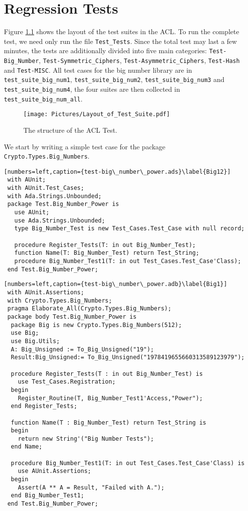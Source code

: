 \chapter{Regression Tests}
Figure \ref{ACLTEST} shows the layout of the test suites in the ACL. To run the complete test, we need only run the file \texttt{Test\_Tests}. Since the total test may last a few minutes, the tests are additionally divided into five main categories: \texttt{Test-Big\_Number}, \texttt{Test-Symmetric\_Ciphers}, \texttt{Test-Asymmetric\_Ciphers}, \texttt{Test-Hash} and \texttt{Test-MISC}. All test cases for the big number library are in \texttt{test\_suite\_big\_num1}, \texttt{test\_suite\_\-big\_num2}, \texttt{test\_suite\_big\_num3} and \texttt{test\_suite\_big\_num4}, the four suites are then collected in \texttt{test\_suite\_big\_num\_all}.
\begin{figure}[h]
  \texttt{[image: Pictures/Layout\_of\_Test\_Suite.pdf]} 
  \caption{The structure of the ACL Test.}\label{ACLTEST}
\end{figure}

We start by writing a simple test case for the package \texttt{Crypto.Types.Big\_Numbers}.
\begin{lstlisting}[numbers=left,caption={test-big\_number\_power.ads}\label{Big12}]
 with AUnit;
 with AUnit.Test_Cases;
 with Ada.Strings.Unbounded;  
 package Test.Big_Number_Power is
   use AUnit;
   use Ada.Strings.Unbounded;
   type Big_Number_Test is new Test_Cases.Test_Case with null record;
 
   procedure Register_Tests(T: in out Big_Number_Test);
   function Name(T: Big_Number_Test) return Test_String;
   procedure Big_Number_Test1(T: in out Test_Cases.Test_Case'Class);
 end Test.Big_Number_Power;
\end{lstlisting}

\begin{lstlisting}[numbers=left,caption={test-big\_number\_power.adb}\label{Big1}]
 with AUnit.Assertions; 
 with Crypto.Types.Big_Numbers;
 pragma Elaborate_All(Crypto.Types.Big_Numbers);
 package body Test.Big_Number_Power is
  package Big is new Crypto.Types.Big_Numbers(512);
  use Big;
  use Big.Utils;
  A: Big_Unsigned := To_Big_Unsigned("19");
  Result:Big_Unsigned:= To_Big_Unsigned("1978419655660313589123979");
	
  procedure Register_Tests(T : in out Big_Number_Test) is
	use Test_Cases.Registration;
  begin
	Register_Routine(T, Big_Number_Test1'Access,"Power");
  end Register_Tests;

  function Name(T : Big_Number_Test) return Test_String is
  begin
	return new String'("Big Number Tests");
  end Name;

  procedure Big_Number_Test1(T: in out Test_Cases.Test_Case'Class) is
    use AUnit.Assertions; 
  begin
    Assert(A ** A = Result, "Failed with A.");
  end Big_Number_Test1;
 end Test.Big_Number_Power;
\end{lstlisting}

